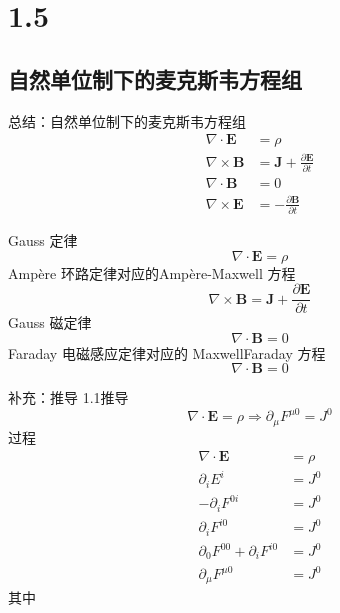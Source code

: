 \section{1.5}

\subsection{自然单位制下的麦克斯韦方程组}

总结：自然单位制下的麦克斯韦方程组
\begin{equation}
    \begin{aligned}
        \nabla \cdot \mathbf{E}&=\rho 
\\
\nabla \times \mathbf{B}&=\mathbf{J}+\frac{\partial \mathbf{E}}{\partial t}
\\
\nabla \cdot \mathbf{B}&=0
\\
\nabla \times \mathbf{E}&=-\frac{\partial \mathbf{B}}{\partial t}
    \end{aligned}
\end{equation}

Gauss 定律
\begin{equation}
    \nabla \cdot \mathbf{E}=\rho 
\end{equation}
Ampère 环路定律对应的Ampère-Maxwell 方程
\begin{equation}
    \nabla \times \mathbf{B}=\mathbf{J}+\frac{\partial \mathbf{E}}{\partial t}
\end{equation}
Gauss 磁定律
\begin{equation}
    \nabla \cdot \mathbf{B}=0
\end{equation}
Faraday 电磁感应定律对应的 MaxwellFaraday 方程
\begin{equation}
    \nabla \cdot \mathbf{B}=0
\end{equation}

补充：推导
1.1推导
\begin{equation}
    \nabla \cdot \mathbf{E}=\rho \Rightarrow \partial _{\mu}F^{\mu 0}=J^0
\end{equation}
过程
\begin{equation}
    \begin{aligned}
        \nabla \cdot \mathbf{E}&=\rho 
\\
\partial _iE^i&=J^0
\\
-\partial _iF^{0i}&=J^0
\\
\partial _iF^{i0}&=J^0
\\
\partial _0F^{00}+\partial _iF^{i0}&=J^0
\\
\partial _{\mu}F^{\mu 0}&=J^0
    \end{aligned}
\end{equation}
其中






